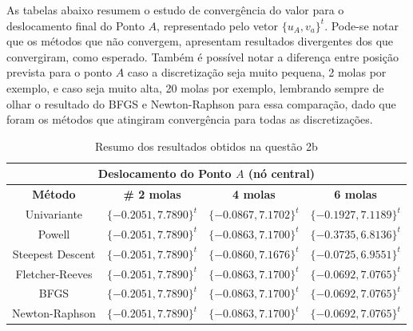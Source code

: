 \documentclass[10pt, a4paper]{article}
\begin{document}
As tabelas abaixo resumem o estudo de convergência do valor para o deslocamento final do Ponto $A$, representado pelo
vetor $\{u_A, v_a\}^t$. Pode-se notar que os métodos que não convergem, apresentam resultados divergentes dos que convergiram,
como esperado. Também é possível notar a diferença entre posição prevista para o ponto $A$ caso a discretização seja muito
pequena, 2 molas por exemplo, e caso seja muito alta, 20 molas por exemplo, lembrando sempre de olhar o resultado do BFGS
e Newton-Raphson para essa comparação, dado que foram os métodos que atingiram convergência para todas as discretizações.

\begin{table}[H]
  \begin{center}
    \begin{tabular}{c|c|c|c}
      \multicolumn{4}{c}{Deslocamento do Ponto $A$ (nó central)}\\
      \hline
      \textbf{Método} & \textbf{\# 2 molas} & \textbf{4 molas} & \textbf{6 molas} \\
      \hline
      Univariante       & $\{-0.2051, 7.7890\}^t$ &	$\{-0.0867, 7.1702\}^t$ &	$\{-0.1927, 7.1189\}^t$ \\
      Powell	          & $\{-0.2051, 7.7890\}^t$ &	$\{-0.0863, 7.1700\}^t$ &	$\{-0.3735, 6.8136\}^t$ \\
      Steepest Descent  & $\{-0.2051, 7.7890\}^t$ &	$\{-0.0860, 7.1676\}^t$ &	$\{-0.0725, 6.9551\}^t$ \\
      Fletcher-Reeves   & $\{-0.2051, 7.7890\}^t$ &	$\{-0.0863, 7.1700\}^t$ &	$\{-0.0692, 7.0765\}^t$ \\
      BFGS	            & $\{-0.2051, 7.7890\}^t$ &	$\{-0.0863, 7.1700\}^t$ &	$\{-0.0692, 7.0765\}^t$ \\
      Newton-Raphson    & $\{-0.2051, 7.7890\}^t$ &	$\{-0.0863, 7.1700\}^t$ &	$\{-0.0692, 7.0765\}^t$
    \end{tabular}
  \end{center}
  \caption{Resumo dos resultados obtidos na questão 2b}
\end{table}
\end{document}

